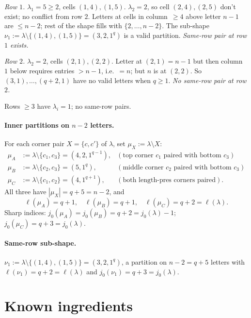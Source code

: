 \documentclass[11pt]{article}
\theoremstyle{definition}
\begin{document}
\emph{Row $1$.} $\lambda_1 = 5 \ge 2$, cells $(1, 4), (1, 5)$.
$\lambda_2 = 2$, so cell $(2, 4), (2, 5)$ don't exist; no conflict from
row $2$. Letters at cells in column~$\ge 4$ above letter $n-1$ are
$\le n - 2$; rest of the shape fills with $\{2, \ldots, n-2\}$. The
sub-shape $\nu_1 := \lambda \setminus \{(1,4), (1,5)\} = (3, 2, 1^q)$
is a valid partition. \emph{Same-row pair at row $1$ exists.}

\emph{Row $2$.} $\lambda_2 = 2$, cells $(2, 1), (2, 2)$. Letter at
$(2, 1) = n-1$ but then column~$1$ below requires entries $> n - 1$,
i.e.\ $= n$; but $n$ is at $(2, 2)$. So $(3, 1), \ldots, (q+2, 1)$ have
no valid letters when $q \ge 1$. \emph{No same-row pair at row $2$.}

Rows $\ge 3$ have $\lambda_i = 1$; no same-row pairs.

\paragraph{Inner partitions on $n - 2$ letters.}
For each corner pair $X = \{c, c'\}$ of $\lambda$, set $\mu_X
:= \lambda \setminus X$:
\begin{align*}
   \mu_A &:= \lambda \setminus \{c_1, c_3\} = (4, 2, 1^{q-1}),
      &(\text{top corner $c_1$ paired with bottom $c_3$})\\
   \mu_B &:= \lambda \setminus \{c_2, c_3\} = (5, 1^q),
      &(\text{middle corner $c_2$ paired with bottom $c_3$})\\
   \mu_C &:= \lambda \setminus \{c_1, c_2\} = (4, 1^{q+1}),
      &(\text{both length-pres corners paired}).
\end{align*}
All three have $|\mu_X| = q + 5 = n - 2$, and
\[
   \ell(\mu_A) = q + 1,
   \quad
   \ell(\mu_B) = q + 1,
   \quad
   \ell(\mu_C) = q + 2 = \ell(\lambda).
\]
Sharp indices: $j_0(\mu_A) = j_0(\mu_B) = q + 2 = j_0(\lambda) - 1$;
$j_0(\mu_C) = q + 3 = j_0(\lambda)$.

\paragraph{Same-row sub-shape.}
$\nu_1 := \lambda \setminus \{(1, 4), (1, 5)\} = (3, 2, 1^q)$, a partition
on $n - 2 = q + 5$ letters with $\ell(\nu_1) = q + 2 = \ell(\lambda)$
and $j_0(\nu_1) = q + 3 = j_0(\lambda)$.

\section{Known ingredients}\label{sec:ingredients}
\end{document}
